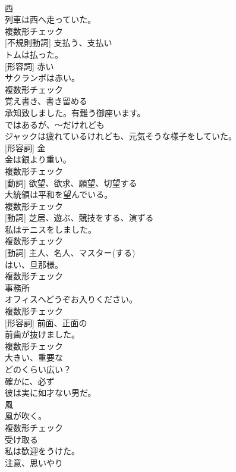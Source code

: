 \documentclass[8pt]{extreport}
\begin{document}
\begin{CJK}{UTF8}{min}
\\	[名詞]	西	
\\	列車は西へ走っていた。	
\\	複数形チェック
\\	[動詞] [不規則動詞]	支払う、支払い	
\\	トムは払った。	
\\	[名詞] [形容詞]	赤い	
\\	サクランボは赤い。	
\\	複数形チェック
\\	[動詞]	覚え書き、書き留める	
\\	承知致しました。有難う御座います。	
\\	[接続詞]	ではあるが、〜だけれども	
\\	ジャックは疲れているけれども、元気そうな様子をしていた。	
\\	[名詞] [形容詞]	金	
\\	金は銀より重い。	
\\	複数形チェック
\\	[名詞] [動詞]	欲望、欲求、願望、切望する	
\\	大統領は平和を望んでいる。	
\\	複数形チェック
\\	[名詞] [動詞]	芝居、遊ぶ、競技をする、演ずる	
\\	私はテニスをしました。	
\\	複数形チェック
\\	[名詞] [動詞]	主人、名人、マスター(する)	
\\	はい、旦那様。	
\\	複数形チェック
\\	[名詞]	事務所	
\\	オフィスへどうぞお入りください。	
\\	複数形チェック
\\	[名詞] [形容詞]	前面、正面の	
\\	前歯が抜けました。	
\\	複数形チェック
\\	[形容詞]	大きい、重要な	
\\	どのくらい広い？	
\\	[副詞]	確かに、必ず	
\\	彼は実に如才ない男だ。	
\\	[名詞]	風	
\\	風が吹く。	
\\	複数形チェック
\\	[動詞]	受け取る	
\\	私は歓迎をうけた。	
\\	[名詞]	注意、思いやり	

\end{CJK}
\end{document}

